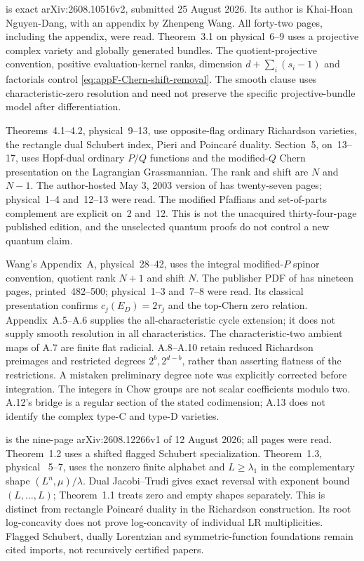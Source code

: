 \cite{NguyenDang26RichardsonV2} is exact arXiv:2608.10516v2,
submitted 25 August 2026. Its author is Khai-Hoan Nguyen-Dang,
with an appendix by Zhenpeng Wang. All forty-two pages, including
the appendix, were read. Theorem~3.1 on physical~6--9 uses a
projective complex variety and globally generated bundles.
The quotient-projective convention, positive evaluation-kernel
ranks, dimension $d+\sum_i(s_i-1)$ and factorials control
\eqref{eq:appF-Chern-shift-removal}. The smooth clause uses
characteristic-zero resolution and need not preserve the specific
projective-bundle model after differentiation.

Theorems~4.1--4.2, physical~9--13, use opposite-flag ordinary
Richardson varieties, the rectangle dual Schubert index, Pieri
and Poincar\'e duality. Section~5, on~13--17, uses Hopf-dual
ordinary $P/Q$ functions and the modified-$Q$ Chern presentation
on the Lagrangian Grassmannian. The rank and shift are $N$ and
$N-1$. The author-hosted May 3, 2003 version of
\cite{KreschTamvakis03LagrangianAuthor} has twenty-seven pages;
physical~1--4 and~12--13 were read. The modified Pfaffians and
set-of-parts complement are explicit on~2 and~12. This is not
the unacquired thirty-four-page published edition, and the
unselected quantum proofs do not control a new quantum claim.

Wang's Appendix~A, physical~28--42, uses the integral modified-$P$
spinor convention, quotient rank $N+1$ and shift $N$.
The publisher PDF of \cite{KreschTamvakis04OrthogonalPublished}
has nineteen pages, printed~482--500; physical~1--3 and~7--8
were read. Its classical presentation confirms
$c_j(E_D)=2\tau_j$ and the top-Chern zero relation.
Appendix~A.5--A.6 supplies the all-characteristic cycle extension;
it does not supply smooth resolution in all characteristics.
The characteristic-two ambient maps of A.7 are finite flat
radicial. A.8--A.10 retain reduced Richardson preimages and
restricted degrees $2^b,2^{d-b}$, rather than asserting flatness
of the restrictions. A mistaken preliminary degree note was
explicitly corrected before integration. The integers in Chow
groups are not scalar coefficients modulo two. A.12's bridge
is a regular section of the stated codimension; A.13 does not
identify the complex type-C and type-D varieties.

\cite{Zhang26SkewSchurV1} is the nine-page arXiv:2608.12266v1
of 12 August 2026; all pages were read. Theorem~1.2 uses a
shifted flagged Schubert specialization. Theorem~1.3, physical
~5--7, uses the nonzero finite alphabet and $L\geq\lambda_1$
in the complementary shape $(L^n,\mu)/\lambda$. Dual
Jacobi--Trudi gives exact reversal with exponent bound
$(L,\ldots,L)$; Theorem~1.1 treats zero and empty shapes
separately. This is distinct from rectangle Poincar\'e duality
in the Richardson construction. Its root log-concavity does not
prove log-concavity of individual LR multiplicities. Flagged
Schubert, dually Lorentzian and symmetric-function foundations
remain cited imports, not recursively certified papers.

